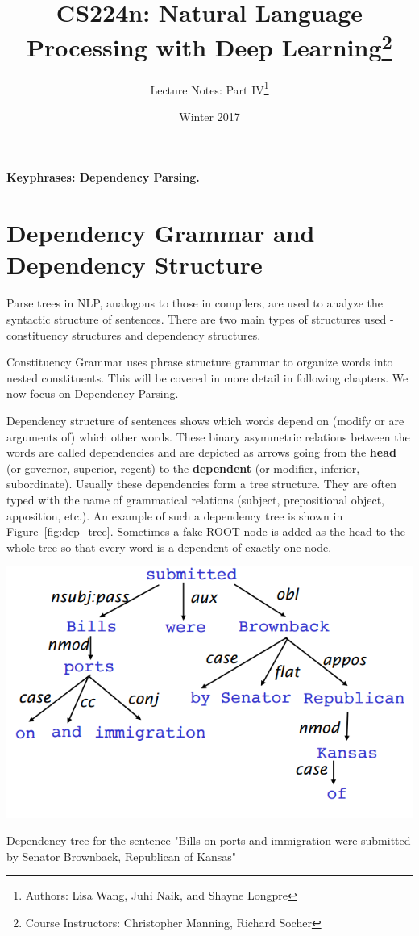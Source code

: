 \documentclass{tufte-handout}
\title{CS224n: Natural Language Processing with Deep Learning\thanks{Course Instructors: Christopher Manning, Richard Socher}}
\author[Lisa Wang, Juhi Naik, Shayne Longpre]{Lecture Notes: Part IV\thanks{Authors: Lisa Wang, Juhi Naik, and Shayne Longpre}}
\date{Winter 2017} %
\begin{document}
\maketitle%

\textbf{Keyphrases: Dependency Parsing.}
\section{Dependency Grammar and Dependency Structure}
Parse trees in NLP, analogous to those in compilers, are used to analyze the syntactic structure of sentences. There are two main types of structures used - constituency structures and dependency structures. 

Constituency Grammar uses phrase structure grammar to organize words into nested constituents. This will be covered in more detail in following chapters. We now focus on Dependency Parsing.

Dependency structure of sentences shows which words depend on (modify or are arguments of) which other words. These binary asymmetric relations between the words are called dependencies and are depicted as arrows going from the \textbf{head} (or governor, superior, regent) to the \textbf{dependent} (or modifier, inferior, subordinate). Usually these dependencies form a tree structure. They are often 	typed with the name of grammatical relations (subject, prepositional object, apposition, etc.). An example of such a dependency tree is shown in Figure~\ref{fig:dep_tree}. Sometimes a fake \textsc{ROOT} node is added as the head to the whole tree so that every word is a dependent of exactly one node.

\begin{marginfigure}
	\centering
	\includegraphics[width=\linewidth]{dep_tree.png}
	\caption {Dependency tree for the sentence "Bills on ports and immigration were submitted by Senator Brownback, Republican of Kansas"}
	\label{fig:dep_tree}
\end{marginfigure}
\end{document}
